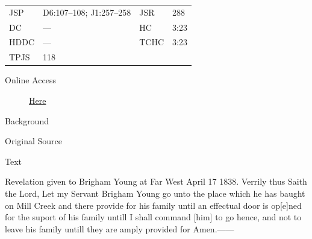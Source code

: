 					\begin{tabular}{p{0.5in}p{1in}p{0.5in}p{1in}}
					JSP	 	& D6:107--108; J1:257--258		& JSR 		& 288 \\
					DC	 	& ---		& HC 		& 3:23 \\
					HDDC 	& ---		& TCHC 		& 3:23 \\
					TPJS 	& 118			& 	 		&  \\
					\end{tabular}
				
				\begin{description}
					\item[Online Access] \href{https://www.josephsmithpapers.org/paper-summary/revelation-17-april-1838/1}{Here}
				\end{description}
				
				\begin{description}
					\item[Background]
				\end{description}
				
				
				\begin{description}
					\item[Original Source]
				\end{description}
				
				
				\begin{description}
					\item[Text]
				\end{description}
				
					Revelation given to Brigham Young at Far West April 17 1838. Verrily thus Saith the Lord, Let my Servant Brigham Young go unto the place which he has baught on Mill Creek and there provide for his family until an effectual door is op[e]ned for the suport of his family untill I shall command [him] to go hence, and not to leave his family untill they are amply provided for Amen.------
					
